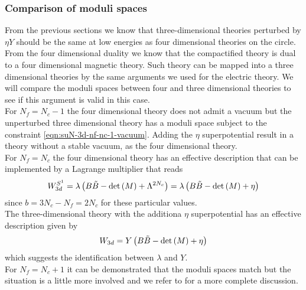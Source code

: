 \subsubsection{Comparison of moduli spaces}
\begin{comment}
For $N_f = N_c$ it can be described by the effective superpotential
\begin{equation}
 W=  \lambda \left( B \tilde{B} - \Det{(M)} +    \right)
\end{equation}
which modifies the Higgs branch and lifts the Coulomb branch.
For greater number of flavours the Higgs branch remains identical while the Coulomb branch remains lifted.\\
\end{comment}
From the previous sections we know that three-dimensional theories perturbed by $\eta Y$ should be the same at low energies as four dimensional theories on the circle. 
From the four dimensional duality we know that the compactified theory is dual to a four dimensional magnetic theory. 
Such theory can be mapped into a three dimensional theories by the same arguments we used for the electric theory.  
We will compare the moduli spaces between four and three dimensional theories to see if this argument is valid in this case.\\
For $N_f = N_c -1$ the four dimensional theory does not admit a vacuum but the unperturbed three dimensional theory has a moduli space subject to the constraint \eqref{eqn:suN-3d-nf-nc-1-vacuum}.
Adding the $\eta$ superpotential result in a theory without a stable vacuum, as the four dimensional theory.\\
For $N_f = N_c$ the four dimensional theory has an effective description that can be implemented by a Lagrange multiplier that reads
\begin{equation}
  W_{3d }^{S^1} = \lambda \left( B \tilde{B} - \mathrm{det } \,{(M)} + \Lambda^{2 N_c} \right) = \lambda \left( B \tilde{B} - \mathrm{det } \,{(M)} + \eta \right) 
  \end{equation}  
since $b = 3 N_c - N_f = 2 N_c$ for these particular values.\\
The three-dimensional theory with the additiona $\eta$ superpotential has an effective description given by
\begin{equation}
	W_{3d} = Y \left( B \tilde{B} - \mathrm{det } \,{(M)} + \eta \right)
\end{equation}
which suggests the identification between $\lambda$ and $Y$.\\
For $N_f = N_c + 1$ it can be demonstrated that the moduli spaces match but the situation is a little more involved and we refer to \cite{Aharony:2013dha} for a more complete discussion.\\ 

